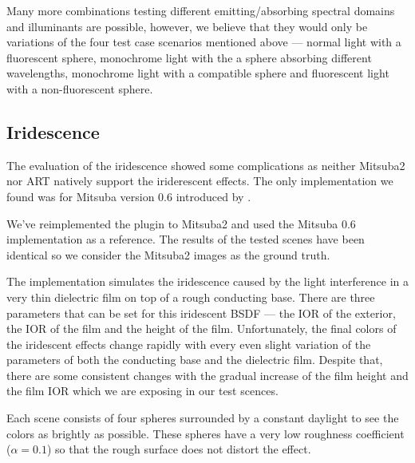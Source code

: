 \begin{description}
\begin{figure}[H]
		\caption{}
		\label{fig:fluorescent_sphere_fluoD50_nonfluo}
	\end{figure}
\end{description}

Many more combinations testing different emitting/absorbing spectral domains and illuminants are possible, however, we believe that they would only be variations of the four test case scenarios mentioned above --- normal light with a fluorescent sphere, monochrome light with the a sphere absorbing different wavelengths, monochrome light with a compatible sphere and fluorescent light with a non-fluorescent sphere.

\subsection{Iridescence}

The evaluation of the iridescence showed some complications as neither Mitsuba2 nor ART natively support the iriderescent effects. The only implementation we found was for Mitsuba version 0.6 introduced by \citet{belcour2017practical}.

We've reimplemented the plugin to Mitsuba2 and used the Mitsuba 0.6 implementation as a reference. The results of the tested scenes have been identical so we consider the Mitsuba2 images as the ground truth.

The implementation simulates the iridescence caused by the light interference in a very thin dielectric film on top of a rough conducting base. There are three parameters that can be set for this iridescent BSDF --- the IOR of the exterior, the IOR of the film and the height of the film. Unfortunately, the final colors of the iridescent effects change rapidly with every even slight variation of the parameters of both the conducting base and the dielectric film. Despite that, there are some consistent changes with the gradual increase of the film height and the film IOR which we are exposing in our test scences. 

Each scene consists of four spheres surrounded by a constant daylight to see the colors as brightly as possible. These spheres have a very low roughness coefficient ($\alpha=0.1$) so that the rough surface does not distort the effect.

